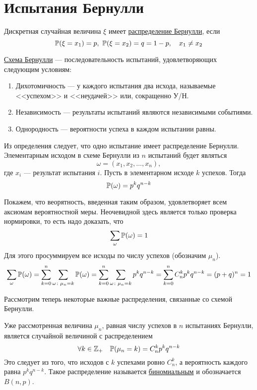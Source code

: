 \section{Испытания Бернулли}

\begin{Def}
Дискретная случайная величина $\xi$ имеет \underline{распределение Бернулли}, если
$$ \mathbb{P}(\xi = x_1) = p,\ \mathbb{P}(\xi = x_2) = q = 1 - p, \quad x_1 \not= x_2$$
\end{Def}

\begin{Def}
\underline{Схема Бернулли} --- последовательность испытаний, удовлетворяющих следующим условиям:
\begin{enumerate}
	\item Дихотомичность --- у каждого испытания два исхода, называемые <<успехом>> и <<неудачей>> или, сокращенно У/Н.
	\item Независимость --- результаты испытаний являются независимыми событиями.
	\item Однородность --- вероятности успеха в каждом испытании равны.
\end{enumerate}
\end{Def}

Из определения следует, что одно испытание имеет распределение Бернулли. Элементарным исходом в схеме Бернулли из $n$ испытаний будет являться
$$\omega = (x_1, x_2, \ldots, x_n),$$
где $x_i$ --- результат испытания $i$. Пусть в элементарном исходе $k$ успехов. Тогда
$$\mathbb{P}(\omega) = p^kq^{n-k}$$

Покажем, что веорятность, введенная таким образом, удовлетворяет всем аксиомам вероятностной меры. Неочевидной здесь является только проверка нормировки, то есть надо доказать, что
$$ \sum\limits_{\omega}\mathbb{P}(\omega) = 1$$
Для этого просуммируем все исходы по числу успехов (обозначим $\mu_n$).
$$ \sum\limits_{\omega}\mathbb{P}(\omega) = \sum\limits_{k = 0}^n\sum\limits_{\omega\colon\mu_n=k}\mathbb{P}(\omega) = \sum\limits_{k = 0}^n\sum\limits_{\omega\colon\mu_n=k}p^kq^{n-k} = 
\sum\limits_{k = 0}^nC_n^kp^kq^{n-k} = (p+q)^n = 1$$

Рассмотрим теперь некоторые важные распределения, связанные со схемой Бернулли.

Уже рассмотренная величина $\mu_n$, равная числу успехов в $n$ испытаниях Бернулли, является случайной величиной с распределением
$$\forall k \in \mathbb{Z}_+ \quad \mathbb{P}(\mu_n=k) = C_n^kp^kq^{n-k}$$
Это следует из того, что исходов с $k$ успехами ровно $C_n^k$, а вероятность каждого равна $p^kq^{n-k}$.
Такое распределение называется \underline{биномиальным} и обозначается $B(n,p)$.

